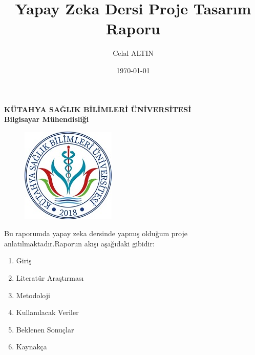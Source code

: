\documentclass[12pt, a4paper]{article}
\title{ Yapay Zeka Dersi Proje Tasarım Raporu}
\author{Celal ALTIN}
\date{\today}
\begin{document}
	\textbf{KÜTAHYA SAĞLIK BİLİMLERİ ÜNİVERSİTESİ}\centering\\
	\textbf{Bilgisayar Mühendisliği}\centering
	\begin{figure}[!h]
		\centering
		\includegraphics{ksbu.png}
	\end{figure}
	\thispagestyle{empty}
	\maketitle

\maketitle\raggedright
Bu raporumda yapay zeka dersinde yapmış olduğum proje anlatılmaktadır.Raporun akışı aşağıdaki gibidir:
\begin{enumerate} 
\item Giriş
\item Literatür Araştırması
\item Metodoloji
\item Kullanılacak Veriler
\item Beklenen Sonuçlar %
\item Kaynakça
\end{enumerate}\raggedright
\newpage
\end{document}
